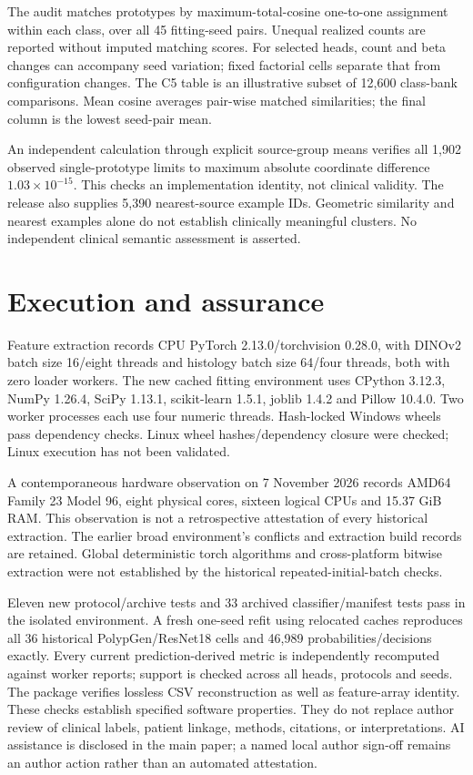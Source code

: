 \documentclass[10pt,letterpaper]{article}
\begin{document}
The audit matches prototypes by maximum-total-cosine one-to-one assignment within each class, over all 45 fitting-seed pairs. Unequal realized counts are reported without imputed matching scores. For selected heads, count and beta changes can accompany seed variation; fixed factorial cells separate that from configuration changes. The C5 table is an illustrative subset of 12,600 class-bank comparisons. Mean cosine averages pair-wise matched similarities; the final column is the lowest seed-pair mean.


An independent calculation through explicit source-group means verifies all 1,902 observed single-prototype limits to maximum absolute coordinate difference $1.03\times10^{-15}$. This checks an implementation identity, not clinical validity. The release also supplies 5,390 nearest-source example IDs. Geometric similarity and nearest examples alone do not establish clinically meaningful clusters. No independent clinical semantic assessment is asserted.

\section{Execution and assurance}
Feature extraction records CPU PyTorch 2.13.0/torchvision 0.28.0, with DINOv2 batch size 16/eight threads and histology batch size 64/four threads, both with zero loader workers. The new cached fitting environment uses CPython 3.12.3, NumPy 1.26.4, SciPy 1.13.1, scikit-learn 1.5.1, joblib 1.4.2 and Pillow 10.4.0. Two worker processes each use four numeric threads. Hash-locked Windows wheels pass dependency checks. Linux wheel hashes/dependency closure were checked; Linux execution has not been validated.

A contemporaneous hardware observation on 7 November 2026 records AMD64 Family 23 Model 96, eight physical cores, sixteen logical CPUs and 15.37 GiB RAM. This observation is not a retrospective attestation of every historical extraction. The earlier broad environment's conflicts and extraction build records are retained. Global deterministic torch algorithms and cross-platform bitwise extraction were not established by the historical repeated-initial-batch checks.

Eleven new protocol/archive tests and 33 archived classifier/manifest tests pass in the isolated environment. A fresh one-seed refit using relocated caches reproduces all 36 historical PolypGen/ResNet18 cells and 46,989 probabilities/decisions exactly. Every current prediction-derived metric is independently recomputed against worker reports; support is checked across all heads, protocols and seeds. The package verifies lossless CSV reconstruction as well as feature-array identity. These checks establish specified software properties. They do not replace author review of clinical labels, patient linkage, methods, citations, or interpretations. AI assistance is disclosed in the main paper; a named local author sign-off remains an author action rather than an automated attestation.
\end{document}
